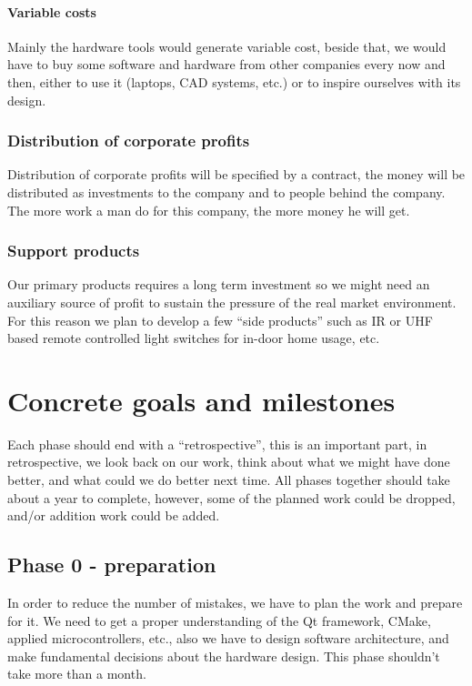 \documentclass[a4paper,twoside,15pt]{book}
\begin{document}
			\subsubsection{Variable costs}
				Mainly the hardware tools would generate variable cost, beside that, we would have to buy some software and hardware from other companies every now and then, either to use it (laptops, CAD systems, etc.) or to inspire ourselves with its design.

		\subsection{Distribution of corporate profits}
			Distribution of corporate profits will be specified by a contract, the money will be distributed as investments to the company and to people behind the company. The more work a man do for this company, the more money he will get.

		\subsection{Support products}
			Our primary products requires a long term investment so we might need an auxiliary source of profit to sustain the pressure of the real market environment. For this reason we plan to develop a few ``side products'' such as IR or UHF based remote controlled light switches for in-door home usage, etc.

\chapter{Concrete goals and milestones}
	Each phase should end with a ``retrospective'', this is an important part, in retrospective, we look back on our work, think about what we might have done better, and what could we do better next time. All phases together should take about a year to complete, however, some of the planned work could be dropped, and/or addition work could be added.

	\section{Phase 0 - preparation}
		In order to reduce the number of mistakes, we have to plan the work and prepare for it. We need to get a proper understanding of the Qt framework, CMake, applied microcontrollers, etc., also we have to design software architecture, and make fundamental decisions about the hardware design. This phase shouldn't take more than a month.
\end{document}
